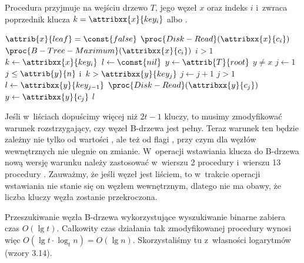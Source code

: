 Procedura przyjmuje na wejściu drzewo $T$, jego węzeł $x$ oraz indeks $i$ i~zwraca poprzednik klucza $k=\attribxx{x}{key_i}$ albo .
\begin{codebox}
\li \If $\attrib{x}{leaf}=\const{false}$
\li   \Then $\proc{Disk-Read}(\attribxx{x}{c_i})$
\li     \Return $\proc{B-Tree-Maximum}(\attribxx{x}{c_i})$
    \End
\li \If $i>1$
\li   \Then \Return {}
    \End
\li $k\gets\attribxx{x}{key_i}$
\li $l\gets\const{nil}$
\li $y\gets\attrib{T}{root}$
\li \While $y\ne x$
\li   \Do $j\gets1$
\li   \While $j\le\attrib{y}{n}$ i~$k>\attribxx{y}{key_j}$
\li     \Do $j\gets j+1$
      \End
\li   \If $j>1$
\li     \Then $l\gets\attribxx{y}{key_{j-1}}$
      \End
\li   $\proc{Disk-Read}(\attribxx{y}{c_j})$
\li   $y\gets\attribxx{y}{c_j}$
    \End
\li \Return $l$
\end{codebox}

\exercise %
\exercise %
Jeśli w~liściach dopuścimy więcej niż $2t-1$ kluczy, to musimy zmodyfikować warunek rozstrzygający, czy węzeł B-drzewa jest pełny.
Teraz warunek ten będzie zależny nie tylko od wartości , ale też od flagi , przy czym dla węzłów wewnętrznych nie ulegnie on zmianie.
W~operacji wstawiania klucza do B-drzewa nową wersję warunku należy zastosować w~wierszu 2 procedury  i~wierszu 13 procedury .
Zauważmy, że jeśli węzeł jest liściem, to w~trakcie operacji wstawiania nie stanie się on węzłem wewnętrznym, dlatego nie ma obawy, że liczba kluczy węzła zostanie przekroczona.

\exercise %
Przeszukiwanie węzła B-drzewa wykorzystujące wyszukiwanie binarne zabiera czas $O(\lg t)$.
Całkowity czas działania tak zmodyfikowanej procedury  wynosi więc $O(\lg t\cdot\log_tn)=O(\lg n)$.
Skorzystaliśmy tu z~własności logarytmów (wzory 3.14).

\exercise %

